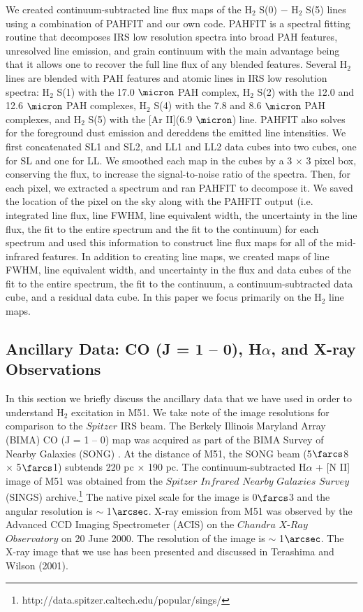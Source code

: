 \documentclass[12pt,preprint]{aastex}
\begin{document}
We created continuum-subtracted line flux maps of the H$_2$
S(0) $-$ H$_2$ S(5) lines using a combination of PAHFIT
\citep{smi07} and our own code.  PAHFIT is a spectral fitting routine
that decomposes IRS low resolution spectra into broad 
PAH features, unresolved line emission, and grain continuum with the main advantage
being that it allows one to recover the full line flux of any blended
features.  Several H$_2$ lines are blended with PAH features and atomic 
lines in IRS low resolution spectra:
H$_2$ S(1) with the 17.0 $\micron$ PAH complex,
H$_2$ S(2) with the 12.0 and 12.6 $\micron$ PAH complexes, 
H$_2$ S(4) with the 7.8 and 8.6 $\micron$ PAH complexes, and 
H$_2$ S(5) with the [Ar II](6.9 $\micron$) line.  
PAHFIT also solves for the foreground dust emission and 
dereddens the emitted line intensities.  We first
concatenated SL1 and SL2, and LL1 and LL2 data cubes into two cubes,
one for SL and one for LL.  We smoothed each map in the cubes by a 3
$\times$ 3 pixel box, conserving the flux, to increase the
signal-to-noise ratio of the spectra.  Then, for each pixel, we
extracted a spectrum and ran PAHFIT to decompose it.  We saved the
location of the pixel on the sky along with the PAHFIT output 
(i.e. integrated line flux, line FWHM, line equivalent width, the 
uncertainty in the line flux, the fit to the entire spectrum and 
the fit to the continuum) for each spectrum and used this 
information to construct line flux maps for all of the mid-infrared 
features.  In addition to creating line maps, we created maps 
of line FWHM, line equivalent width, and uncertainty in the 
flux and data cubes of the fit to the entire spectrum, the fit to 
the continuum, a continuum-subtracted data cube, and a 
residual data cube.  In this paper we focus primarily on the 
H$_2$ line maps.

\subsection{Ancillary Data: CO (J = 1 -- 0), H$\alpha$, and X-ray Observations}

In this section we briefly discuss the ancillary data that we 
have used in order to understand H$_2$ excitation in M51.  
We take note of the image resolutions for comparison to the
$Spitzer$ IRS beam.  The Berkely Illinois Maryland Array (BIMA) CO (J = 1 -- 0) map was
acquired as part of the BIMA Survey of Nearby Galaxies (SONG)
\citep{reg01, hel03}.  At the distance of M51, the SONG beam
(5$\farcs$8 $\times$ 5$\farcs$1) subtends 220 pc $\times$ 190 pc.  
The continuum-subtracted H$\alpha$ + [N II] image of M51 was obtained from the
$Spitzer$ $Infrared$ $Nearby$ $Galaxies$ $Survey$ (SINGS) archive.\footnote{http://data.spitzer.caltech.edu/popular/sings/} 
The native pixel scale for the image is 0$\farcs$3 
and the angular resolution is $\sim$ 1$\arcsec$.  X-ray 
emission from M51 was observed by the Advanced CCD 
Imaging Spectrometer (ACIS) on the $Chandra$ $X$-$Ray$ 
$Observatory$ on 20 June 2000.  The resolution of 
the image is $\sim$ 1$\arcsec$.  The X-ray image that 
we use has been presented and discussed in 
Terashima and Wilson (2001).
\end{document}
